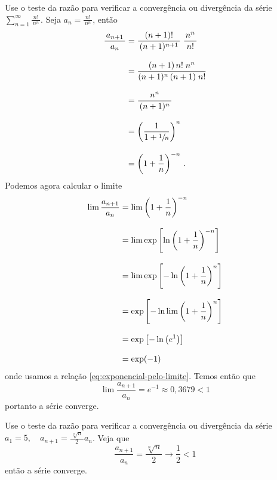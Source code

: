 \begin{example}
  Use o teste da razão para verificar a convergência ou divergência da série
  \(
    \sum_{n=1}^\infty \frac{n!}{\,n^n\,}
  \).
  \solution
  Seja
  \(
    a_n = \frac{n!}{\,n^n\,}
  \),
  então
  \begin{align*}
    \frac{\,a_{n+1}\,}{a_n}
    & = \frac{(n+1)!}{\,(n+1)^{n+1}\,} \; \frac{\,n^n\,}{n!} \\[3mm]
    & = \frac{\,(n+1)\,n!\;n^n\,}{(n+1)^n\,(n+1)\;n!}        \\[3mm]
    & = \frac{n^n}{\,(n+1)^n\,}                              \\[3mm]
    & = \left(\frac{1}{1+\sfrac{1}{n}}\right)^n              \\[3mm]
    & = \left( 1 + \frac{1}{n} \right)^{-n}                  \,.
  \end{align*}
  Podemos agora calcular o limite
  \begin{align*}
    \lim \frac{a_{n+1}}{a_n}
    & = \lim              \left(1 + \frac{1}{n}\right)^{-n}         \\[3mm]
    & = \lim\exp\left[ \ln\left(1 + \frac{1}{n}\right)^{-n\vphantom{L}} \right] \\[3mm]
    & = \lim\exp\left[-\ln\left(1 + \frac{1}{n}\right)^{ n\vphantom{L}} \right] \\[3mm]
    & = \exp\left[-\ln\lim\left(1 + \frac{1}{n}\right)^{ n\vphantom{L}} \right] \\[3mm]
    & = \exp\left[-\ln\left(e^1\right) \right] \\[3mm]
    & = \exp(-1)
  \end{align*}
  onde usamos a relação \eqref{eq:exponencial-pelo-limite}.
  Temos então que
  \[
    \lim \frac{a_{n+1}}{a_n} = e^{-1} \approx 0,3679 < 1
  \]
  portanto a série converge.
\end{example}

\begin{example}
  Use o teste da razão para verificar a convergência ou divergência da série
  \(
    a_1 = 5,
    \quad
    a_{n+1} = \frac{\,\sqrt[n]{n}\,}{2} a_n
  \).
  \solution
  Veja que
  \[
    \frac{a_{n+1}}{a_n} = \frac{\sqrt[n]{n}}{2}
                        \to \frac{1}{2}
                        < 1
  \]
  então a série converge.
\end{example}

